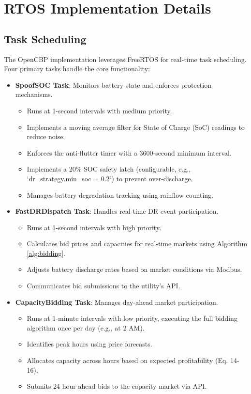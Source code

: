\documentclass[11pt,a4paper]{article}
\begin{document}
\section{RTOS Implementation Details}
\subsection{Task Scheduling}

The OpenCBP implementation leverages FreeRTOS for real-time task scheduling. Four primary tasks handle the core functionality:

\begin{itemize}
    \item \textbf{SpoofSOC Task}: Monitors battery state and enforces protection mechanisms.
    \begin{itemize}
        \item Runs at 1-second intervals with medium priority.
        \item Implements a moving average filter for State of Charge (SoC) readings to reduce noise.
        \item Enforces the anti-flutter timer with a 3600-second minimum interval.
        \item Implements a 20\% SOC safety latch (configurable, e.g., `dr_strategy.min_soc = 0.2`) to prevent over-discharge.
        \item Manages battery degradation tracking using rainflow counting.
    \end{itemize}
    
    \item \textbf{FastDRDispatch Task}: Handles real-time DR event participation.
    \begin{itemize}
        \item Runs at 1-second intervals with high priority.
        \item Calculates bid prices and capacities for real-time markets using Algorithm \ref{alg:bidding}.
        \item Adjusts battery discharge rates based on market conditions via Modbus.
        \item Communicates bid submissions to the utility's API.
    \end{itemize}
    
    \item \textbf{CapacityBidding Task}: Manages day-ahead market participation.
    \begin{itemize}
        \item Runs at 1-minute intervals with low priority, executing the full bidding algorithm once per day (e.g., at 2 AM).
        \item Identifies peak hours using price forecasts.
        \item Allocates capacity across hours based on expected profitability (Eq. 14-16).
        \item Submits 24-hour-ahead bids to the capacity market via API.
    \end{itemize}
    

\end{itemize}
\end{document}
